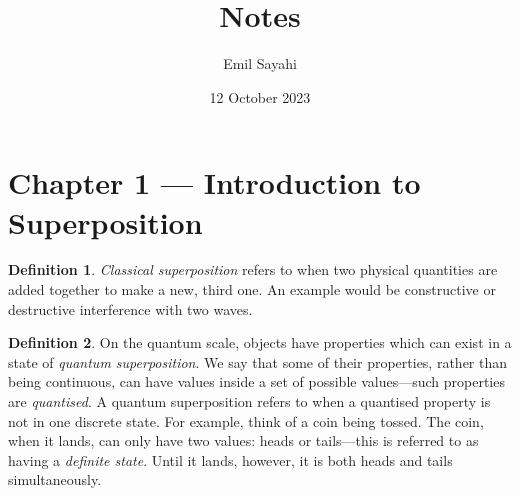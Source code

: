 \documentclass{article}
\title{Notes}
\author{Emil Sayahi}
\date{12 October 2023}
\theoremstyle{definition}
\newtheorem{definition}{Definition}[section]
\begin{document}
\maketitle









\section{Chapter 1 --- Introduction to Superposition}

\begin{definition}
    \emph{Classical superposition} refers to when two physical quantities are added together to make a new, third one. An example would be constructive or destructive interference with two waves.
\end{definition}
\begin{definition}
    On the quantum scale, objects have properties which can exist in a state of \emph{quantum superposition}. We say that some of their properties, rather than being continuous, can have values inside a set of possible values---such properties are \emph{quantised}. A quantum superposition refers to when a quantised property is not in one discrete state. For example, think of a coin being tossed. The coin, when it lands, can only have two values: heads or tails---this is referred to as having a \emph{definite state}. Until it lands, however, it is both heads and tails simultaneously.
\end{definition}
\end{document}
